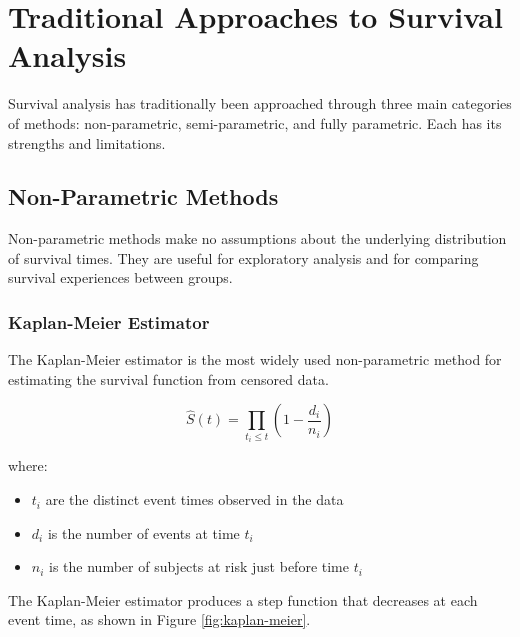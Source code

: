 \section{Traditional Approaches to Survival Analysis}

Survival analysis has traditionally been approached through three main categories of methods: non-parametric, semi-parametric, and fully parametric. Each has its strengths and limitations.

\subsection{Non-Parametric Methods}

Non-parametric methods make no assumptions about the underlying distribution of survival times. They are useful for exploratory analysis and for comparing survival experiences between groups.

\subsubsection{Kaplan-Meier Estimator}

The Kaplan-Meier estimator is the most widely used non-parametric method for estimating the survival function from censored data.

\begin{equationbox}[title=Kaplan-Meier Estimator]
\begin{equation}
\hat{S}(t) = \prod_{t_i \leq t} \left(1 - \frac{d_i}{n_i}\right)
\end{equation}

where:
\begin{itemize}
    \item $t_i$ are the distinct event times observed in the data
    \item $d_i$ is the number of events at time $t_i$
    \item $n_i$ is the number of subjects at risk just before time $t_i$
\end{itemize}
\end{equationbox}

The Kaplan-Meier estimator produces a step function that decreases at each event time, as shown in Figure \ref{fig:kaplan-meier}.

